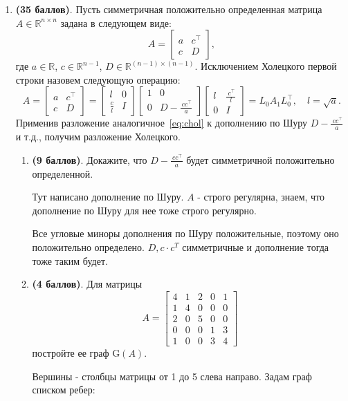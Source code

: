 \documentclass[a4paper, 11pt]{article}
\newcommand{\prob}[1]{\item \textbf{(#1 баллов)}.}
\begin{document}
\begin{enumerate}
		
		\prob{35} Пусть симметричная положительно определенная матрица $A\in \mathbb{R}^{n\times n}$ задана в следующем виде:
		$$A = \begin{bmatrix} a&c^{\top}\\c&D\end{bmatrix},$$
		где $a\in \mathbb{R}$, $c\in \mathbb{R}^{n-1}$, $D\in \mathbb{R}^{(n-1)\times (n-1)}$. Исключением Холецкого первой строки назовем следующую операцию:
		\begin{equation}\label{eq:chol}A =  
			\begin{bmatrix} a&c^{\top}\\c&D\end{bmatrix} = 
			\begin{bmatrix} l&0\\\frac{c}{l}&I\end{bmatrix}
			\begin{bmatrix} 1&0\\0&D-\frac{~cc^{\top}}{a}\end{bmatrix}
			\begin{bmatrix} l&\frac{~c^{\top}}{l}\\0&I\end{bmatrix} = L_0A_1L_0^{\top}, \quad l = \sqrt{a}.
		\end{equation}
		Применив разложение аналогичное~\eqref{eq:chol} к дополнению по Шуру $D-\frac{~cc^{\top}}{a}$ и т.д., получим разложение Холецкого. 
		
		\begin{enumerate}
			\prob{9} Докажите, что $D-\frac{~cc^{\top}}{a}$ будет симметричной положительно определенной. 
			
			Тут написано дополнение по Шуру. $A$ - строго регулярна, знаем, что дополнение по Шуру для нее тоже строго регулярно. 
			
			Все угловые миноры дополнения по Шуру положительные, поэтому оно положительно определено. $D, c 	\cdot c^T$ симметричные и дополнение тогда тоже таким будет.			
			\prob{4} Для матрицы 
			\begin{equation}\label{eq:a}A = \begin{bmatrix} 4&1&2&0&1\\1&4&0&0&0\\2&0&5&0&0\\0&0&0&1&3 \\ 1&0&0&3&4\end{bmatrix} \end{equation}
			постройте ее граф G$(A)$.
			
			Вершины - столбцы матрицы от 1 до 5 слева направо. Задам граф списком ребер:
			

\end{enumerate}
\end{enumerate}
\end{document}
